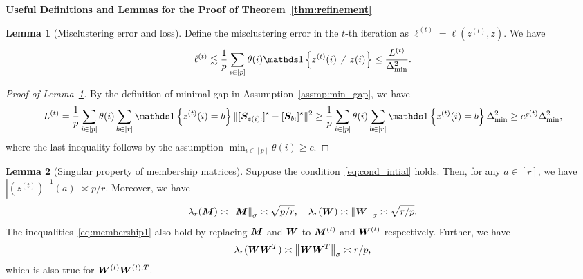 \documentclass[lettersize,onecolumn,journal]{IEEEtran}
\theoremstyle{definition}
\newtheorem{lem}{Lemma}
\theoremstyle{definition}
\newcommand{\of}[1]{\left(#1\right)}
\newcommand{\offf}[1]{\left\{#1\right\}}
\begin{document}
{\bf Useful Definitions and Lemmas for the Proof of Theorem~\ref{thm:refinement}} 


\begin{lem}[Misclustering error and loss]\label{lem:mis} Define the misclustering error in the $t$-th iteration as $\ell^{(t)} = \ell(z^{(t)}, z)$. We have 
\begin{equation}
    \ell^{(t)} \lesssim \frac{1}{p}\sum_{i \in [p]} \theta(i) \ind\offf{ z^{(t)}(i) \neq z(i) } \leq \frac{L^{(t)}}{\Delta_{\min}^2}.
\end{equation}
\end{lem}

\begin{proof}[Proof of Lemma~\ref{lem:mis}]
By the definition of minimal gap in Assumption~\ref{assmp:min_gap}, we have 
\begin{equation}
         L^{(t)} = \frac{1}{p}  \sum_{i \in [p]} \theta(i) \sum_{b \in [r]}  \ind \offf{ z^{(t)}(i) = b } \onormSize{}{ [ \mS_{ z(i):}  ]^s - [ \mS_{b:}  ]^s  }^2 \geq \frac{1}{p}  \sum_{i \in [p]} \theta(i) \sum_{b \in [r]}  \ind \offf{ z^{(t)}(i) = b } \Delta_{\min}^2 \geq c \ell^{(t)} \Delta_{\min}^2,
    \end{equation}
    where the last inequality follows by the assumption $\min_{i \in [p]} \theta(i) \geq c$.
\end{proof}

\begin{lem}[Singular property of membership matrices]\label{lem:membership} Suppose the condition~\eqref{eq:cond_intial} holds. Then, for any $a \in [r]$, we have $|\of{z^{(t)}}^{-1}(a)| \asymp p/r$. Moreover, we have 
\begin{equation}\label{eq:membership1}
    \lambda_{r}(\mM) \asymp \onorm{\mM}_{\sigma} \asymp \sqrt{p/r}, \quad  \lambda_{r}(\mW) \asymp \onorm{\mW}_{\sigma} \asymp \sqrt{r/p}.
\end{equation}
The inequalities~\eqref{eq:membership1} also hold by replacing $\bm M$ and $\bm{W}$ to $\bm M^{(t)}$ and $\bm{W}^{(t)}$ respectively. 
Further, we have 
\begin{equation}\label{eq:WWsingular}
   \lambda_{r}(\mW\mW^T) \asymp \onorm{\mW\mW^T}_{\sigma} \asymp r/p,
\end{equation}
which is also true for $\bm{W}^{(t)}\bm{W}^{(t),T}$.
\end{lem}
\end{document}
